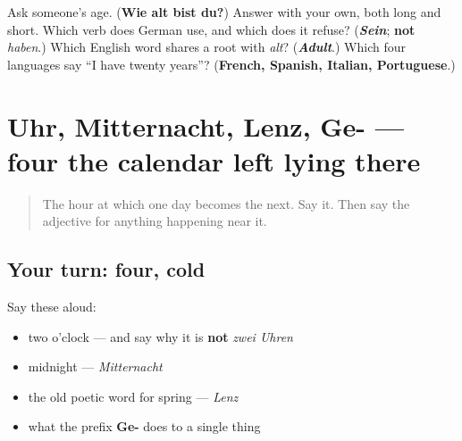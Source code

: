 \begin{tcolorbox}[breakable,colback=teal!4,colframe=teal!35!black,title={Before you move on}]
Ask someone's age. (\textbf{Wie alt bist du?}) Answer with your own, both long and short. Which verb does German use, and which does it refuse? (\emph{\textbf{Sein}}; \textbf{not} \emph{haben}.) Which English word shares a root with \emph{alt}? (\emph{\textbf{Adult}}.) Which four languages say \textquotedblleft{}I have twenty years\textquotedblright{}? (\textbf{French, Spanish, Italian, Portuguese}.)
\end{tcolorbox}
\section[Practice]{Uhr, Mitternacht, Lenz, Ge- — four the calendar left lying there}

\label{lesson:GE-R14-was-der-kalender-liegen-liess}



\begin{quote}
The hour at which one day becomes the next. Say it. Then say the adjective for anything happening near it.
\end{quote}

\subsection*{Your turn: four, cold}
Say these aloud:

\begin{itemize}
\raggedright
  \item two o'clock — and say why it is \textbf{not} \emph{zwei Uhren}
  \item midnight — \emph{Mitternacht}
  \item the old poetic word for spring — \emph{Lenz}
  \item what the prefix \textbf{Ge-} does to a single thing
\end{itemize}

